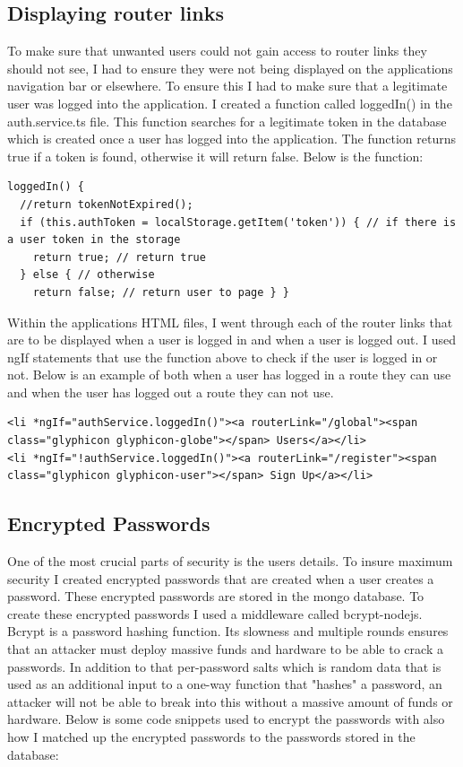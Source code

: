 \subsection{Displaying router links}
To make sure that unwanted users could not gain access to router links they should not see, I had to ensure they were not being displayed on the applications navigation bar or elsewhere. To ensure this I had to make sure that a legitimate user was logged into the application. I created a function called loggedIn() in the auth.service.ts file. This function searches for a legitimate token in the database which is created once a user has logged into the application. The function returns true if a token is found, otherwise it will return false. Below is the function:

\begin{lstlisting}
loggedIn() {
  //return tokenNotExpired();
  if (this.authToken = localStorage.getItem('token')) { // if there is a user token in the storage
    return true; // return true
  } else { // otherwise 
    return false; // return user to page } }
\end{lstlisting}

Within the applications HTML files, I went through each of the router links that are to be displayed when a user is logged in and when a user is logged out. I used ngIf statements that use the function above to check if the user is logged in or not. Below is an example of both when a user has logged in a route they can use and when the user has logged out a route they can not use.

\begin{lstlisting}
<li *ngIf="authService.loggedIn()"><a routerLink="/global"><span class="glyphicon glyphicon-globe"></span> Users</a></li>
<li *ngIf="!authService.loggedIn()"><a routerLink="/register"><span class="glyphicon glyphicon-user"></span> Sign Up</a></li>
\end{lstlisting}


\subsection{Encrypted Passwords}
One of the most crucial parts of security is the users details. To insure maximum security I created encrypted passwords that are created when a user creates a password. These encrypted passwords are stored in the mongo database. To create these encrypted passwords I used a middleware called bcrypt-nodejs. Bcrypt is a password hashing function. Its slowness and multiple rounds ensures that an attacker must deploy massive funds and hardware to be able to crack a passwords. In addition to that per-password salts which is random data that is used as an additional input to a one-way function that "hashes" a password, an attacker will not be able to break into this without a massive amount of funds or hardware\cite{Whatisbc86}. Below is some code snippets used to encrypt the passwords with also how I matched up the encrypted passwords to the passwords stored in the database:

